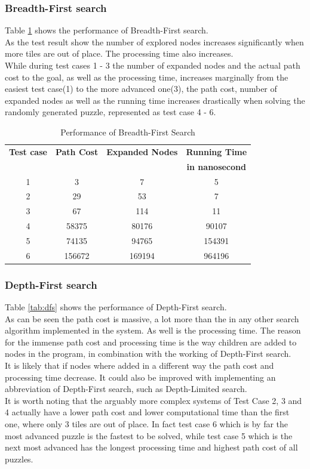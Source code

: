 \documentclass[journal]{IEEEtran}
\begin{document}
\subsubsection{Breadth-First search}
Table \ref{tab:bfs} shows the performance of Breadth-First search.\\
As the test result show the number of explored nodes increases significantly when more tiles are out of place. The processing time also increases.\\
While during test cases 1 - 3 the number of expanded nodes and the actual path cost to the goal, as well as the processing time, increases marginally from the easiest test case(1) to the more advanced one(3), the path cost, number of expanded nodes as well as the running time increases drastically when solving the randomly generated puzzle, represented as test case 4 - 6. \\ 
\begin{table}[h]
\renewcommand{\arraystretch}{1.3}
\centering
\caption{Performance of Breadth-First Search}
\begin{tabular}{|c|c|c|c|}
\hline
\bfseries Test case &\bfseries Path Cost & \bfseries Expanded Nodes & \bfseries Running Time \\
 & & &  \bfseries in nanosecond\\\hline
1 & 3 & 7 & 5 \\
2 & 29 & 53 & 7\\
3 & 67 & 114 & 11 \\
4 & 58375 & 80176 & 90107\\
5 & 74135 & 94765 & 154391 \\
6 & 156672 & 169194 & 964196 \\\hline
\end{tabular}
\label{tab:bfs}
\end{table}


\subsubsection{Depth-First search}
Table \ref{tab:dfs} shows the performance of Depth-First search.\\
As can be seen the path cost is massive, a lot more than the in any other search algorithm implemented in the system. As well is the processing time. The reason for the immense path cost and processing time is the way children are added to nodes in the program, in combination with the working of Depth-First search. \\
It is likely that if nodes where added in a different way the path cost and processing time decrease. It could also be improved with implementing an abbreviation of Depth-First search, such as Depth-Limited search. \\
It is worth noting that the arguably more complex systems of Test Case 2, 3 and 4 actually have a lower path cost and lower computational time than the first one, where only 3 tiles are out of place. In fact test case 6 which is by far the most advanced puzzle is the fastest to be solved, while test case 5 which is the next most advanced has the longest processing time and highest path cost of all puzzles. \\
\end{document}
